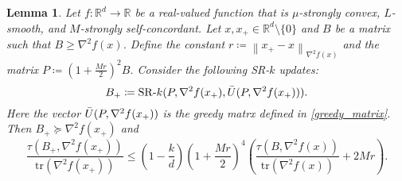 \documentclass[letterpaper]{article} %
\theoremstyle{plain}
\newtheorem{lemma}[theorem]{Lemma}
\theoremstyle{definition}
\theoremstyle{remark}
\newcommand\norm[1]{\left\lVert#1\right\rVert}
\def\BR{{\mathbb{R}}}
\begin{document}
\begin{lemma}
    Let $f: \BR^d \to \BR$ be a real-valued function that is $\mu$-strongly convex, $L$-smooth, and $M$-strongly self-concordant. Let $x, x_{+} \in \BR^d \setminus \{0\}$ and $B$ be a matrix such that $B \geq \nabla^2 f(x)$. Define the constant $r \coloneqq \norm{x_{+} - x}_{\nabla^2 f(x)}$ and the matrix $P \coloneqq \left(1 + \frac{M r}{2}\right)^2 B$. Consider the following SR-$k$ updates:
    \begin{equation*}
        B_{+} \coloneqq \mathrm{SR}\textrm{-}k(P, \nabla^2 f(x_{+}), \Bar{U}(P, \nabla^2 f(x_{+}))).
    \end{equation*}
    Here the vector $\Bar{U}(P, \nabla^2 f(x_{+}))$ is the greedy matrx defined in \eqref{greedy_matrix}. Then $B_{+} \succeq \nabla^2 f(x_{+})$ and
    \begin{equation*}
        \frac{\tau(B_{+}, \nabla^2 f(x_{+}))}{\mathrm{tr}(\nabla^2 f(x_{+}))} \leq \left(1 - \frac{k}{d}\right)\left(1 + \frac{Mr}{2}\right)^4 \left(\frac{\tau (B, \nabla^2 f(x))}{\mathrm{tr}(\nabla^2 f(x))} + 2 M r  \right).
    \end{equation*}
    \label{lemma:one_step_approx_srk}
\end{lemma}
\end{document}
